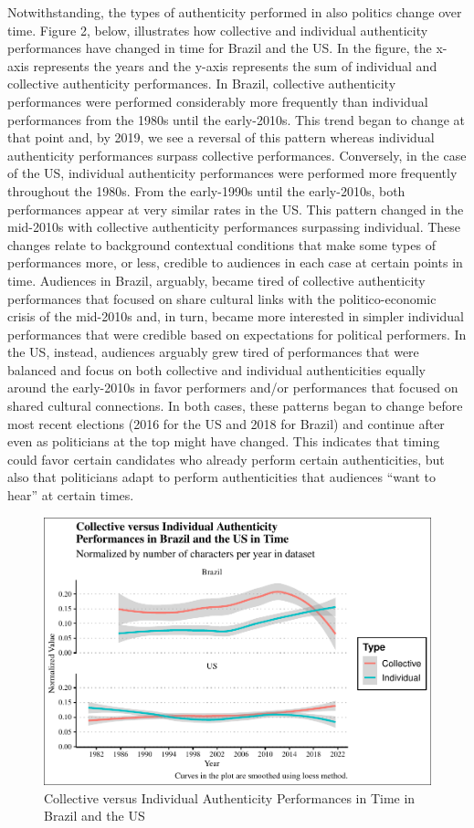 \documentclass[smallextended]{svjour3}       %
\begin{document}
Notwithstanding, the types of authenticity performed in also politics
change over time. Figure 2, below, illustrates how collective and
individual authenticity performances have changed in time for Brazil and
the US. In the figure, the x-axis represents the years and the y-axis
represents the sum of individual and collective authenticity
performances. In Brazil, collective authenticity performances were
performed considerably more frequently than individual performances from
the 1980s until the early-2010s. This trend began to change at that
point and, by 2019, we see a reversal of this pattern whereas individual
authenticity performances surpass collective performances. Conversely,
in the case of the US, individual authenticity performances were
performed more frequently throughout the 1980s. From the early-1990s
until the early-2010s, both performances appear at very similar rates in
the US. This pattern changed in the mid-2010s with collective
authenticity performances surpassing individual. These changes relate to
background contextual conditions that make some types of performances
more, or less, credible to audiences in each case at certain points in
time. Audiences in Brazil, arguably, became tired of collective
authenticity performances that focused on share cultural links with the
politico-economic crisis of the mid-2010s and, in turn, became more
interested in simpler individual performances that were credible based
on expectations for political performers. In the US, instead, audiences
arguably grew tired of performances that were balanced and focus on both
collective and individual authenticities equally around the early-2010s
in favor performers and/or performances that focused on shared cultural
connections. In both cases, these patterns began to change before most
recent elections (2016 for the US and 2018 for Brazil) and continue
after even as politicians at the top might have changed. This indicates
that timing could favor certain candidates who already perform certain
authenticities, but also that politicians adapt to perform
authenticities that audiences ``want to hear'' at certain times.

\begin{figure}
\centering
\includegraphics{antipc_files/figure-latex/Figure 2-1.pdf}
\caption{Collective versus Individual Authenticity Performances in Time
in Brazil and the US}
\end{figure}
\end{document}
